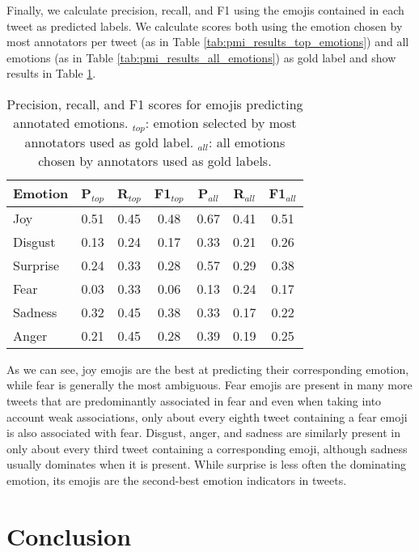 \documentclass[10pt, a4paper]{article}
\begin{document}
Finally, we calculate precision, recall, and F1 using the emojis contained in each tweet as predicted labels. We calculate scores both using the emotion chosen by most annotators per tweet (as in Table \ref{tab:pmi_results_top_emotions}) and all emotions (as in Table \ref{tab:pmi_results_all_emotions}) as gold label and show results in Table \ref{tab:precision_emojis}.

\begin{table}[!ht]
\centering
\begin{tabular}{l | c | c | c | c | c | c}
\textbf{Emotion} & \textbf{P$_{top}$} & \textbf{R$_{top}$} & \textbf{F1$_{top}$} & \textbf{P$_{all}$} & \textbf{R$_{all}$} & \textbf{F1$_{all}$} \\\hline
Joy & 0.51 & 0.45 & 0.48 & 0.67 & 0.41 & 0.51 \\
Disgust & 0.13 & 0.24 & 0.17 & 0.33 & 0.21 & 0.26 \\
Surprise & 0.24 & 0.33 & 0.28 & 0.57 & 0.29 & 0.38 \\
Fear & 0.03 & 0.33 & 0.06 & 0.13 & 0.24 & 0.17 \\
Sadness & 0.32 & 0.45 & 0.38 & 0.33 & 0.17 & 0.22 \\
Anger & 0.21 & 0.45 & 0.28 & 0.39 & 0.19 & 0.25
\end{tabular}
\caption{Precision, recall, and F1 scores for emojis predicting annotated emotions. $_{top}$: emotion selected by most annotators used as gold label. $_{all}$: all emotions chosen by annotators used as gold labels.}
\label{tab:precision_emojis}
\end{table}

As we can see, joy emojis are the best at predicting their corresponding emotion, while fear is generally the most ambiguous. Fear emojis are present in many more tweets that are predominantly associated in fear and even when taking into account weak associations, only about every eighth tweet containing a fear emoji is also associated with fear. Disgust, anger, and sadness are similarly present in only about every third tweet containing a corresponding emoji, although sadness usually dominates when it is present. While surprise is less often the dominating emotion, its emojis are the second-best emotion indicators in tweets.

\section{Conclusion}
\end{document}
